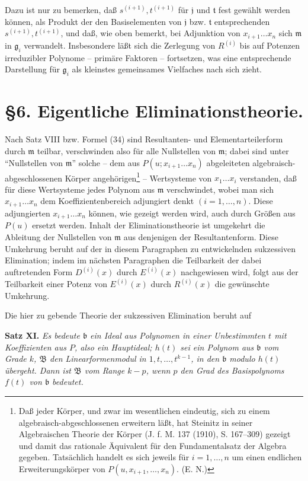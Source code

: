 \documentclass[11pt]{article}
\providecommand{\Bmod}{\mathfrak B}
\providecommand{\mideal}{\mathfrak m}
\providecommand{\gideal}{\mathfrak g}
\providecommand{\jideal}{\mathfrak j}
\providecommand{\tideal}{\mathfrak t}
\providecommand{\bideal}{\mathfrak b}
\begin{document}
Dazu ist nur zu bemerken, daß $s^{(i+1)},t^{(i+1)}$ für $\jideal$ und $\tideal$ fest gewählt werden können, als Produkt der den Basiselementen von $\jideal$ bzw. $\tideal$ entsprechenden $s^{(i+1)},t^{(i+1)}$, und daß, wie oben bemerkt, bei Adjunktion von $x_{i+1}\ldots x_n$ sich $\mideal$ in $\gideal_i$ verwandelt. Insbesondere läßt sich die Zerlegung von $R^{(i)}$ bis auf Potenzen irreduzibler Polynome -- primäre Faktoren -- fortsetzen, was eine entsprechende Darstellung für $\gideal_i$ als kleinstes gemeinsames Vielfaches nach sich zieht.

\section*{\S 6. Eigentliche Eliminationstheorie.}

Nach Satz VIII bzw. Formel (34) sind Resultanten- und Elementarteilerform durch $\mideal$ teilbar, verschwinden also für alle Nullstellen von $\mideal$; dabei sind unter ``Nullstellen von $\mideal$'' solche -- dem aus $P(u;x_{i+1}\ldots x_n)$ abgeleiteten algebraisch-abgeschlossenen Körper angehörigen\footnote{Daß jeder Körper, und zwar im wesentlichen eindeutig, sich zu einem algebraisch-abgeschlossenen erweitern läßt, hat Steinitz in seiner Algebraischen Theorie der Körper (J. f. M. 137 (1910), S. 167--309) gezeigt und damit das rationale Äquivalent für den Fundamentalsatz der Algebra gegeben. Tatsächlich handelt es sich jeweils für $i=1,\ldots,n$ um einen endlichen Erweiterungskörper von $P(u,x_{i+1},\ldots,x_n)$. (E. N.)} -- Wertsysteme von $x_1\ldots x_i$ verstanden, daß für diese Wertsysteme jedes Polynom aus $\mideal$ verschwindet, wobei man sich $x_{i+1}\ldots x_n$ dem Koeffizientenbereich adjungiert denkt $(i=1,\ldots,n)$. Diese adjungierten $x_{i+1}\ldots x_n$ können, wie gezeigt werden wird, auch durch Größen aus $P(u)$ ersetzt werden. Inhalt der Eliminationstheorie ist umgekehrt die Ableitung der Nullstellen von $\mideal$ aus denjenigen der Resultantenform. Diese Umkehrung beruht auf der in diesem Paragraphen zu entwickelnden sukzessiven Elimination; indem im nächsten Paragraphen die Teilbarkeit der dabei auftretenden Form $D^{(i)}(x)$ durch $E^{(i)}(x)$ nachgewiesen wird, folgt aus der Teilbarkeit einer Potenz von $E^{(i)}(x)$ durch $R^{(i)}(x)$ die gewünschte Umkehrung.

Die hier zu gebende Theorie der sukzessiven Elimination beruht auf

\medskip
\noindent\textbf{Satz XI.} \emph{Es bedeute $\bideal$ ein Ideal aus Polynomen in einer Unbestimmten $t$ mit Koeffizienten aus $P$, also ein Hauptideal; $h(t)$ sei ein Polynom aus $\bideal$ vom Grade $k$, $\Bmod$ den Linearformenmodul in $1,t,\ldots,t^{k-1}$, in den $\bideal$ modulo $h(t)$ übergeht. Dann ist $\Bmod$ vom Range $k-p$, wenn $p$ den Grad des Basispolynoms $f(t)$ von $\bideal$ bedeutet.}
\end{document}
